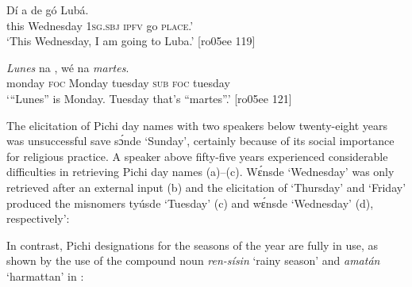 \ea%
    \label{ex:key:1746}
    \gll Dí    a    de  gó  Lubá.\\
this  Wednesday  \textsc{1sg.sbj}  \textsc{ipfv}  go  \textsc{place}.’\\

\glt ‘This Wednesday, I am going to Luba.’ [ro05ee 119]
\z


\ea%
    \label{ex:key:1747}
    \gll \textit{Lunes}  na  ,    wé  na  \textit{martes}.\\
monday  \textsc{foc}  Monday  tuesday  \textsc{sub}  \textsc{foc}  tuesday\\

\glt ‘“Lunes” is Monday. Tuesday that’s “martes”.’ [ro05ee 121]
\z

The elicitation of Pichi day names with two speakers below twenty-eight years was unsuccessful save sɔ́nde ‘Sunday’, certainly because of its social importance for religious practice. A speaker above fifty-five years experienced considerable difficulties in retrieving Pichi day names (a)–(c). Wɛ́nsde ‘Wednesday’ was only retrieved after an external input (b) and the elicitation of ‘Thursday’ and ‘Friday’ produced the misnomers tyúsde ‘Tuesday’ (c) and wɛ́nsde ‘Wednesday’ (d), respectively’:


\ea%
    \label{ex:key:1748}
\z\z

In contrast, Pichi designations for the seasons of the year are fully in use, as shown by the use of the compound noun \textit{ren-sísin} ‘rainy season’  and \textit{amatán} ‘harmattan’ in :



